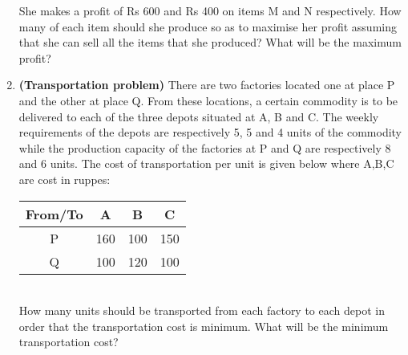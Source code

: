 \begin{enumerate}[label=\arabic*.,ref=\thesection.\theenumi]
She makes a profit of Rs 600 and Rs 400 on items M and N respectively. How many
of each item should she produce so as to maximise her profit assuming that she can sell
all the items that she produced? What will be the maximum profit?\\
\item \textbf{(Transportation problem)} There are two factories located one at
place P and the other at place Q. From these locations, a certain commodity is to be
delivered to each of the three depots situated at A, B and C. The weekly requirements
of the depots are respectively 5, 5 and 4 units of the commodity while the production
capacity of the factories at P and Q are respectively 8 and 6 units. The cost of transportation per unit is given below where A,B,C are cost in ruppes:\\
\begin{tabular}{|c|c|c|c|}
\hline
From/To & A & B & C\\
\hline
P & 160 & 100 & 150\\
\hline
Q & 100 &120 & 100\\
\hline
\end{tabular}\\
How many units should be transported from each factory to each depot in order that
the transportation cost is minimum. What will be the minimum transportation cost?\\





\end{enumerate}
%    
    
